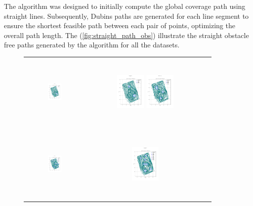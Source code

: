 \vspace{3mm} 

The algorithm was designed to initially compute the global coverage path using straight lines. Subsequently, Dubins paths are generated for each line segment to ensure the shortest feasible path between each pair of points, optimizing the overall path length. The (\autoref{fig:straight_path_obs}) illustrate the straight obstacle free paths generated by the algorithm for all the datasets.

\begin{figure}[]
    \centering
    \begin{tabular}{ccc} 
         \includegraphics[height=36mm,width=0.24\textwidth]{Images/simulation_obs/obs_straight/1.png}
        & \includegraphics[height=36mm,width=0.24\textwidth]{Images/simulation_obs/obs_straight/2.png}
         \includegraphics[height=36mm,width=0.24\textwidth]{Images/simulation_obs/obs_straight/3.png}\\[-4pt]

        \includegraphics[height=36mm,width=0.24\textwidth]{Images/simulation_obs/obs_straight/4.png}
        & \includegraphics[height=36mm,width=0.24\textwidth]{Images/simulation_obs/obs_straight/5.png} 


\end{tabular}
\end{figure}
